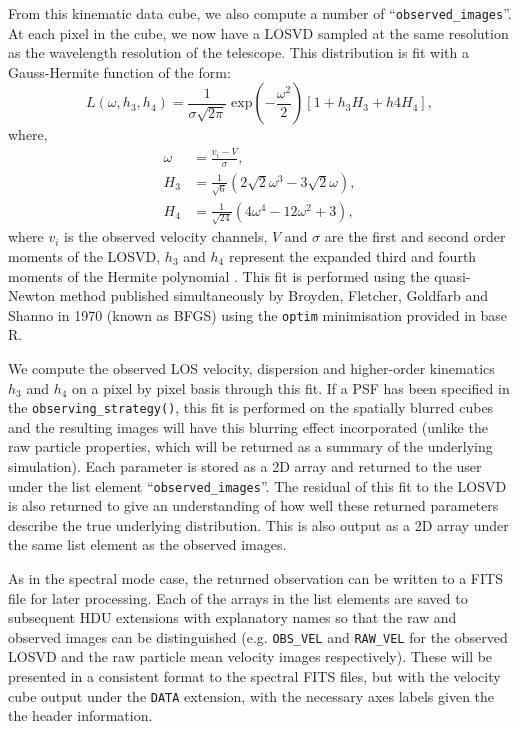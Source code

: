 \documentclass[
  journal=pasa,
  manuscript=research-paper, %
  year=2020,
  volume=37,
]{cup-journal}
\newcommand{\observingstrategy}[1]{\texttt{observing\_strategy()}#1}
\begin{document}
From this kinematic data cube, we also compute a number of ``\texttt{observed\_images}''. 
At each pixel in the cube, we now have a LOSVD sampled at the same resolution as the wavelength resolution of the telescope. 
This distribution is fit with a Gauss-Hermite function of the form:
\begin{equation}
    L(\omega, h_3, h_4) = \frac{1}{\sigma\sqrt{2\pi}} \; \text{exp}\left(-\frac{\omega^2}{2} \right) \left[ 1 + h_3 H_3 + h4 H_4 \right],
\end{equation}
where,
\begin{align}
    \omega &= \frac{v_i - V}{\sigma}, \\
    H_3 &= \frac{1}{\sqrt{6}} \left( 2\sqrt{2} \omega^3 - 3\sqrt{2} \omega \right), \\
    H_4 &= \frac{1}{\sqrt{24}}\left( 4 \omega^4 - 12 \omega^2 + 3 \right),
\end{align}
where $v_i$ is the observed velocity channels, $V$ and $\sigma$ are the first and second order moments of the LOSVD, $h_3$ and $h_4$ represent the expanded third and fourth moments of the Hermite polynomial \citep{vanderMarel1993AGalaxies, Cappellari2017ImprovingFunctions}.
This fit is performed using the quasi-Newton method published simultaneously by  Broyden, Fletcher, Goldfarb and Shanno in 1970 (known as BFGS) \citep{Broyden1970BFGS, Fletcher1970BFGS, Goldfarb1970BFGS, Shanno1970BFGS} using the \texttt{optim} minimisation provided in base R. 

We compute the observed LOS velocity, dispersion and higher-order kinematics $h_3$ and $h_4$ on a pixel by pixel basis through this fit. 
If a PSF has been specified in the \observingstrategy, this fit is performed on the spatially blurred cubes and the resulting images will have this blurring effect incorporated (unlike the raw particle properties, which will be returned as a summary of the underlying simulation). 
Each parameter is stored as a 2D array and returned to the user under the list element ``\texttt{observed\_images}''.
The residual of this fit to the LOSVD is also returned to give an understanding of how well these returned parameters describe the true underlying distribution.
This is also output as a 2D array under the same list element as the observed images. 

As in the spectral mode case, the returned observation can be written to a FITS file for later processing.
Each of the arrays in the list elements are saved to subsequent HDU extensions with explanatory names so that the raw and observed images can be distinguished (e.g. \texttt{OBS\_VEL} and \texttt{RAW\_VEL} for the observed LOSVD and the raw particle mean velocity images respectively).
These will be presented in a consistent format to the spectral FITS files, but with the velocity cube output under the \texttt{DATA} extension, with the necessary axes labels given the the header information. 
\end{document}
